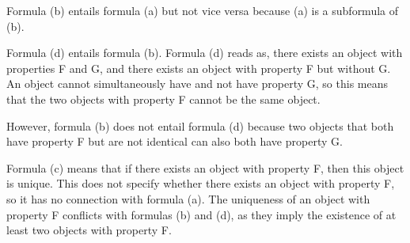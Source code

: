 Formula (b) entails formula (a) but not vice versa because (a) is a subformula of (b).

Formula (d) entails formula (b). Formula (d) reads as, there exists an object with properties F and G, and there exists an object with property F but without G. An object cannot simultaneously have and not have property G, so this means that the two objects with property F cannot be the same object.

However, formula (b) does not entail formula (d) because two objects that both have property F but are not identical can also both have property G.

Formula (c) means that if there exists an object with property F, then this object is unique. This does not specify whether there exists an object with property F, so it has no connection with formula (a). The uniqueness of an object with property F conflicts with formulas (b) and (d), as they imply the existence of at least two objects with property F.
